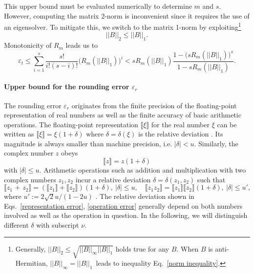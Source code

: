 \documentclass[12pt]{article}
\renewcommand{\norm}[1]{\left|\left|#1\right|\right|}
\begin{document}
This upper bound must be evaluated numerically to determine $m$ and $s$. However, computing the matrix 2-norm is inconvenient since it requires the use of an eigensolver. To mitigate this, we switch to the matrix 1-norm by exploiting\footnote{Generally, $\norm{B}_2\leq\sqrt{\norm{B}_\infty\norm{B}_1}$ \cite{wilkinson1994rounding} holds true for any $B$. When $B$ is anti-Hermitian, $\norm{B}_\infty=\norm{B}_1$\ leads to inequality Eq.\ \eqref{norm inequality}.}
\begin{equation}
\label{norm inequality}
    \norm{B}_2\leq\norm{B}_1.
\end{equation}
Monotonicity of $R_m$ leads us to
\begin{equation}
    \label{truncation}
    \varepsilon_t \leq 
    \sum_{i=1}^{s}\frac{s!}{i!(s-i)!}\big(R_m(\norm{B}_1)\big)^i
    < sR_m(\norm{B}_1)\frac{1-\big(sR_m(\norm{B}_1)\big)^s}{1-sR_m(\norm{B}_1)}.
\end{equation}


\paragraph{Upper bound for the rounding error \texorpdfstring{$\varepsilon_r$}{epsilon\_r}}

\label{rounding error upper bound}
The rounding error $\varepsilon_r$ originates from the finite precision of the floating-point representation of real numbers as well as the finite accuracy of basic arithmetic operations. The floating-point representation  $\llbracket \xi \rrbracket$ for the real number $\xi $ can be written as $\llbracket \xi \rrbracket=\xi(1+\delta)$ where $\delta=\delta(\xi)$ is the relative deviation \cite{higham2002accuracy}. Its magnitude is always smaller than machine precision, i.e. $|\delta|<u$. Similarly, the complex number $z$ obeys 
\begin{equation}
    \label{representation error}
    \llbracket z\rrbracket=z(1+\delta)
\end{equation}
with $|\delta|\leq u$. Arithmetic operations such as addition and multiplication with two complex numbers $z_1, z_2$ incur a relative deviation $\delta=\delta(z_1,z_2)$ such that 
\begin{equation}
\label{operation error}
    \llbracket z_1 \text{ + } z_2\rrbracket =(\llbracket z_1 \rrbracket+\llbracket z_2\rrbracket)(1+\delta),\ |\delta|\leq u, \quad\llbracket z_1 z_2 \rrbracket=\llbracket z_1\rrbracket \llbracket z_2\rrbracket(1+\delta),\ |\delta|\leq u',
\end{equation}
where $u':=2\sqrt{2}u/(1-2u)$ \cite{higham2002accuracy}. The relative deviation shown in Eqs.\ \eqref{representation error}, \eqref{operation error} generally depend on both numbers involved as well as the operation in question. In the following, we will distinguish different $\delta$ with subscript $\nu$.
\end{document}
